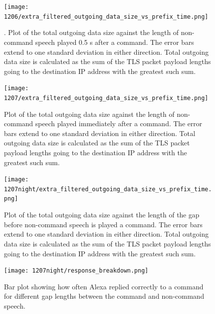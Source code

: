 \begin{figure}[]
    \centering
    \texttt{[image: 1206/extra\_filtered\_outgoing\_data\_size\_vs\_prefix\_time.png]}
    \caption{. Plot of the total outgoing data size against the length of non-command speech played 0.5 s after a command. The error bars extend to one standard deviation in either direction. Total outgoing data size is calculated as the sum of the TLS packet payload lengths going to the destination IP address with the greatest such sum.}
    \label{fig:postfix_gap}
\end{figure}

\begin{figure}[]
    \centering
    \texttt{[image: 1207/extra\_filtered\_outgoing\_data\_size\_vs\_prefix\_time.png]}
    \caption{Plot of the total outgoing data size against the length of non-command speech played immediately after a command. The error bars extend to one standard deviation in either direction. Total outgoing data size is calculated as the sum of the TLS packet payload lengths going to the destination IP address with the greatest such sum.}
    \label{fig:postfix_nogap}
\end{figure}

\begin{figure}[]
    \centering
    \texttt{[image: 1207night/extra\_filtered\_outgoing\_data\_size\_vs\_prefix\_time.png]}
    \caption{Plot of the total outgoing data size against the length of the gap before non-command speech is played a command. The error bars extend to one standard deviation in either direction. Total outgoing data size is calculated as the sum of the TLS packet payload lengths going to the destination IP address with the greatest such sum.}
    \label{fig:postfix_variablegap_sizes}
\end{figure}

\begin{figure}[]
    \centering
    \texttt{[image: 1207night/response\_breakdown.png]}
    \caption{ Bar plot showing how often Alexa replied correctly to a command for different gap lengths between the command and non-command speech.}
    \label{fig:postfix_variablegap_breakdown}
\end{figure}

